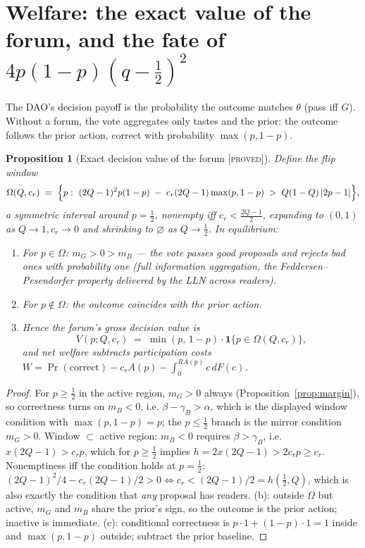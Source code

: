 \documentclass[11pt]{article}
\newtheorem{proposition}{Proposition}
\theoremstyle{remark}
\newcommand{\Pro}{\Pr}
\newcommand{\ind}[1]{\mathbf{1}\{#1\}}
\newcommand{\statusP}{\textsc{[proved]}}
\begin{document}
\section{Welfare: the exact value of the forum, and the fate of $4p(1-p)(q-\frac12)^2$}
\label{sec:welfare}

The DAO's decision payoff is the probability the outcome matches $\theta$
(pass iff $G$). Without a forum, the vote aggregates only tastes and the prior:
the outcome follows the prior action, correct with probability $\max(p,1-p)$.

\begin{proposition}[Exact decision value of the forum \statusP]\label{prop:welfare}
Define the \emph{flip window}
\[
\Omega(Q,c_r)\;=\;\Bigl\{p:\ (2Q-1)^2p(1-p)\;-\;c_r(2Q-1)\max(p,1-p)\;>\;Q(1-Q)\,|2p-1|\Bigr\},
\]
a symmetric interval around $p=\tfrac12$, nonempty iff $c_r<\tfrac{2Q-1}{2}$,
expanding to $(0,1)$ as $Q\to1,c_r\to0$ and shrinking to $\varnothing$ as
$Q\to\tfrac12$. In equilibrium:
\begin{enumerate}[label=(\alph*),itemsep=1pt]
\item For $p\in\Omega$: $m_G>0>m_B$ --- the vote passes good proposals and
rejects bad ones \emph{with probability one} (full information aggregation, the
Feddersen--Pesendorfer property delivered by the LLN across readers).
\item For $p\notin\Omega$: the outcome coincides with the prior action.
\item Hence the forum's gross decision value is
\begin{equation}\label{eq:V}
V(p;Q,c_r)\;=\;\min(p,\,1-p)\cdot\ind{p\in\Omega(Q,c_r)},
\end{equation}
and net welfare subtracts participation costs
$W=\Pro(\mathrm{correct})-c_r A(p)-\int_0^{RA(p)}c\,dF(c)$.
\end{enumerate}
\end{proposition}

\begin{proof}
For $p\ge\tfrac12$ in the active region, $m_G>0$ always
(Proposition~\ref{prop:margin}), so correctness turns on $m_B<0$, i.e.
$\beta-\gamma_B>\alpha$, which is the displayed window condition with
$\max(p,1-p)=p$; the $p\le\tfrac12$ branch is the mirror condition $m_G>0$.
Window $\subset$ active region: $m_B<0$ requires $\beta>\gamma_B$, i.e.
$x(2Q-1)>c_rp$, which for $p\ge\tfrac12$ implies $h=2x(2Q-1)>2c_rp\ge c_r$.
Nonemptiness iff the condition holds at $p=\tfrac12$:
$(2Q-1)^2/4-c_r(2Q-1)/2>0\iff c_r<(2Q-1)/2=h(\tfrac12,Q)$, which is also
exactly the condition that \emph{any} proposal has readers. (b): outside
$\Omega$ but active, $m_G$ and $m_B$ share the prior's sign, so the outcome is
the prior action; inactive is immediate. (c): conditional correctness is
$p\cdot1+(1-p)\cdot1=1$ inside and $\max(p,1-p)$ outside; subtract the prior
baseline.
\end{proof}
\end{document}
